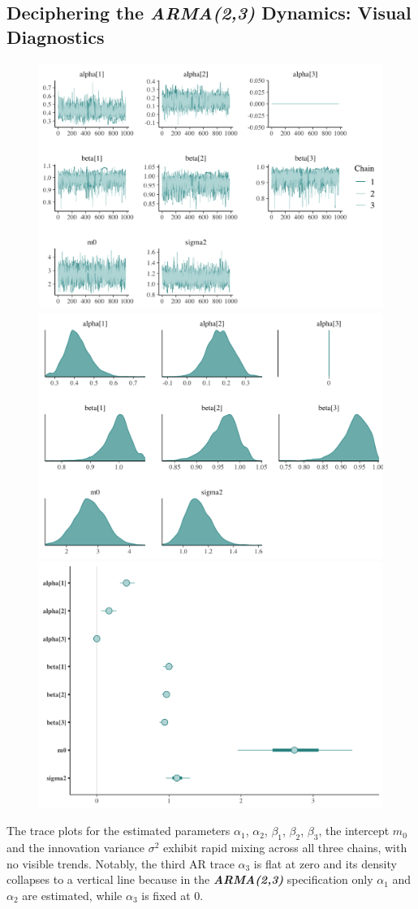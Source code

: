 \documentclass{Configuration_Files/PoliMi3i_thesis}
\begin{document}
\subsection{Deciphering the \textbf{\textit{ARMA(2,3)}} Dynamics: Visual Diagnostics}
\begin{figure}[H]
    \centering
    \includegraphics[width=0.62\linewidth]{ARMA_trace.png}
    \vspace{0.5em}
    
    \includegraphics[width=0.62\linewidth]{ARMA_density.png}
    \vspace{0.5em}
    
    \includegraphics[width=0.62\linewidth]{ARMA_interval.png}
\end{figure}
\newpage  
The trace plots for the estimated parameters \(\alpha_1\), \(\alpha_2\), \(\beta_1\), \(\beta_2\), \(\beta_3\), the intercept \(m_0\) and the innovation variance \(\sigma^2\) exhibit rapid mixing across all three chains, with no visible trends. Notably, the third AR trace \(\alpha_3\) is flat at zero and its density collapses to a vertical line because in the \textbf{\textit{ARMA(2,3)}} specification only \(\alpha_1\) and \(\alpha_2\) are estimated, while \(\alpha_3\) is fixed at 0.
\end{document}
